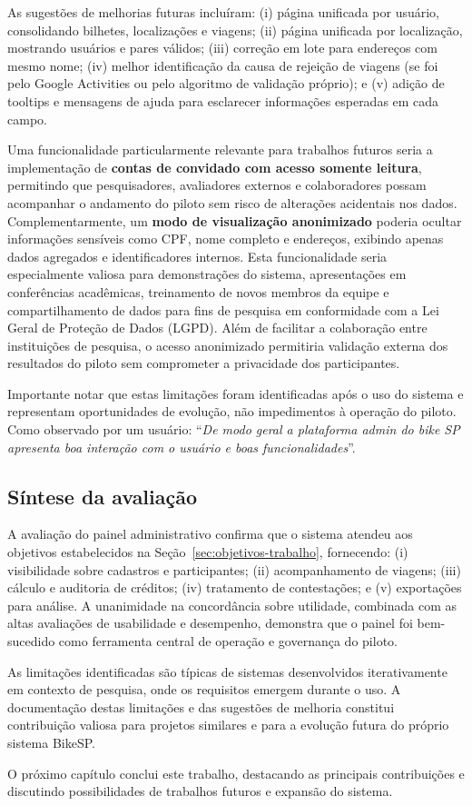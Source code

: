 As sugestões de melhorias futuras incluíram: (i) página unificada por usuário, consolidando bilhetes, localizações e viagens; (ii) página unificada por localização, mostrando usuários e pares válidos; (iii) correção em lote para endereços com mesmo nome; (iv) melhor identificação da causa de rejeição de viagens (se foi pelo Google Activities ou pelo algoritmo de validação próprio); e (v) adição de tooltips e mensagens de ajuda para esclarecer informações esperadas em cada campo.

Uma funcionalidade particularmente relevante para trabalhos futuros seria a implementação de \textbf{contas de convidado com acesso somente leitura}, permitindo que pesquisadores, avaliadores externos e colaboradores possam acompanhar o andamento do piloto sem risco de alterações acidentais nos dados. Complementarmente, um \textbf{modo de visualização anonimizado} poderia ocultar informações sensíveis como CPF, nome completo e endereços, exibindo apenas dados agregados e identificadores internos. Esta funcionalidade seria especialmente valiosa para demonstrações do sistema, apresentações em conferências acadêmicas, treinamento de novos membros da equipe e compartilhamento de dados para fins de pesquisa em conformidade com a Lei Geral de Proteção de Dados (LGPD). Além de facilitar a colaboração entre instituições de pesquisa, o acesso anonimizado permitiria validação externa dos resultados do piloto sem comprometer a privacidade dos participantes.

Importante notar que estas limitações foram identificadas após o uso do sistema e representam oportunidades de evolução, não impedimentos à operação do piloto. Como observado por um usuário: ``\textit{De modo geral a plataforma admin do bike SP apresenta boa interação com o usuário e boas funcionalidades}''.

\subsection{Síntese da avaliação}

A avaliação do painel administrativo confirma que o sistema atendeu aos objetivos estabelecidos na Seção~\ref{sec:objetivos-trabalho}, fornecendo: (i) visibilidade sobre cadastros e participantes; (ii) acompanhamento de viagens; (iii) cálculo e auditoria de créditos; (iv) tratamento de contestações; e (v) exportações para análise. A unanimidade na concordância sobre utilidade, combinada com as altas avaliações de usabilidade e desempenho, demonstra que o painel foi bem-sucedido como ferramenta central de operação e governança do piloto.

As limitações identificadas são típicas de sistemas desenvolvidos iterativamente em contexto de pesquisa, onde os requisitos emergem durante o uso. A documentação destas limitações e das sugestões de melhoria constitui contribuição valiosa para projetos similares e para a evolução futura do próprio sistema BikeSP.

O próximo capítulo conclui este trabalho, destacando as principais contribuições e discutindo possibilidades de trabalhos futuros e expansão do sistema.


